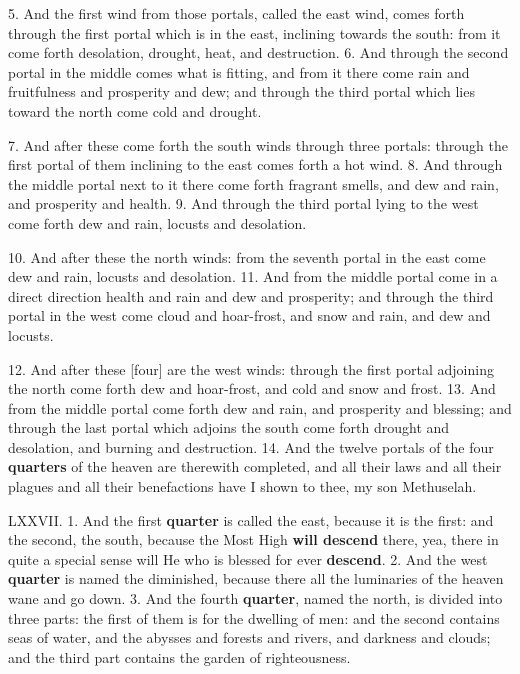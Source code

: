 5. And the first wind from those portals, called the
east wind, comes forth through the first portal which
is in the east, inclining towards the south: from it
come forth desolation, drought, heat, and destruction.
6. And through the second portal in the middle
comes what is fitting, and from it there come rain
and fruitfulness and prosperity and dew; and
through the third portal which lies toward the north
come cold and drought.

7. And after these come forth the south winds
through three portals: through the first portal of
them inclining to the east comes forth a hot wind.
8. And through the middle portal next to it there
come forth fragrant smells, and dew and rain, and
prosperity and health. 9. And through the third
portal lying to the west come forth dew and rain,
locusts and desolation.

10. And after these the north winds: from the
seventh portal in the east come dew and rain, locusts
and desolation. 11. And from the middle portal
come in a direct direction health and rain and dew
and prosperity; and through the third portal in the
west come cloud and hoar-frost, and snow and rain,
and dew and locusts.

12. And after these [four] are the west winds:
through the first portal adjoining the north come
forth dew and hoar-frost, and cold and snow and frost.
13. And from the middle portal come forth dew
and rain, and prosperity and blessing; and through
the last portal which adjoins the south come forth
drought and desolation, and burning and destruction.
14. And the twelve portals of the four \textbf{quarters} of
the heaven are therewith completed, and all their
laws and all their plagues and all their benefactions
have I shown to thee, my son Methuselah.


LXXVII. 1. And the first \textbf{quarter} is called the
east, because it is the first: and the second, the south,
because the Most High \textbf{will descend} there, yea, there
in quite a special sense will He who is blessed for ever
\textbf{descend}. 2. And the west \textbf{quarter} is named the
diminished, because there all the luminaries of the
heaven wane and go down. 3. And the fourth
\textbf{quarter}, named the north, is divided into three parts:
the first of them is for the dwelling of men: and the
second contains seas of water, and the abysses and
forests and rivers, and darkness and clouds; and
the third part contains the garden of righteousness.

